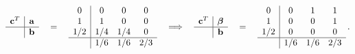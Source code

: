 \documentclass[11pt, oneside]{article}
\numberwithin{equation}{section}
\theoremstyle{definition}
\newcommand{\bs}[1]{\boldsymbol{#1}}
\begin{document}
\begin{align}\begin{array}{c|c}
\mathbf{c}^T  & \mathbf{a} \\
\hline
  & \mathbf{b}    
\end{array} 
\quad  =  \quad 
\begin{array}{c|ccc}
0  & 0  & 0  & 0  \\
1  & 1  & 0 & 0  \\
1/2  & 1/4  & 1/4 & 0  \\
\hline
  & 1/6 &1/6 &2/3    
\end{array}\quad  \Longrightarrow \quad 
\begin{array}{c|c}
\mathbf{c}^T  & \bs{\beta} \\
\hline
  & \mathbf{b}    
\end{array} 
\quad  =  \quad 
\begin{array}{c|ccc}
0 & 0  & 1  & 1 \\
1  & 0  & 0 & 1  \\
1/2  & 0  & 0 & 0  \\
\hline
   & 1/6 &1/6 &2/3  
\end{array}\,. \label{eq:RSPRK SSP}
\end{align}
\end{document}
